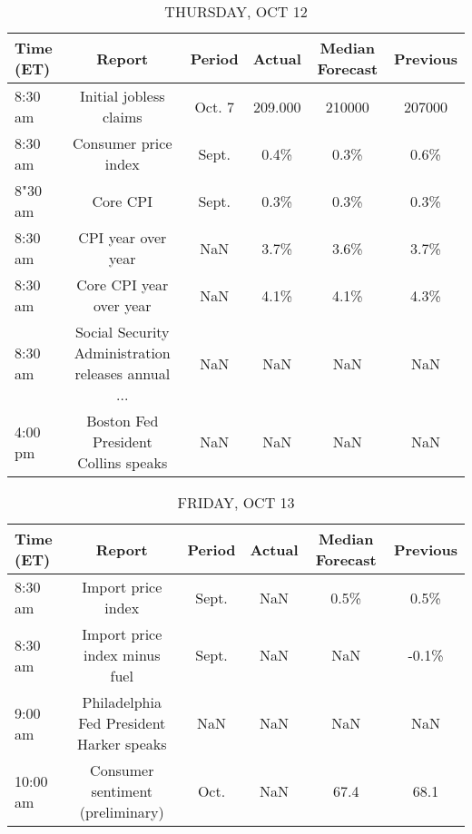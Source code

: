 \documentclass{article}%
\begin{document}
\begin{table}[htbp]%
\caption{THURSDAY, OCT 12}%
\centering%
\begin{adjustbox}{width=1\textwidth}%
\begin{tabular}{lccccc}
\toprule
Time (ET) &                                             Report & Period &  Actual & Median Forecast & Previous \\
\midrule
  8:30 am &                             Initial jobless claims & Oct. 7 & 209.000 &          210000 &   207000 \\
  8:30 am &                               Consumer price index &  Sept. &    0.4\% &            0.3\% &     0.6\% \\
  8"30 am &                                           Core CPI &  Sept. &    0.3\% &            0.3\% &     0.3\% \\
  8:30 am &                                 CPI year over year &    NaN &    3.7\% &            3.6\% &     3.7\% \\
  8:30 am &                            Core CPI year over year &    NaN &    4.1\% &            4.1\% &     4.3\% \\
  8:30 am & Social Security Administration releases annual ... &    NaN &     NaN &             NaN &      NaN \\
  4:00 pm &                Boston Fed President Collins speaks &    NaN &     NaN &             NaN &      NaN \\
\bottomrule
\end{tabular}
%
\end{adjustbox}%
\end{table}

%


\begin{table}[htbp]%
\caption{FRIDAY, OCT 13}%
\centering%
\begin{adjustbox}{width=1\textwidth}%
\begin{tabular}{lccccc}
\toprule
Time (ET) &                                   Report & Period & Actual & Median Forecast & Previous \\
\midrule
  8:30 am &                       Import price index &  Sept. &    NaN &            0.5\% &     0.5\% \\
  8:30 am &            Import price index minus fuel &  Sept. &    NaN &             NaN &    -0.1\% \\
  9:00 am & Philadelphia Fed President Harker speaks &    NaN &    NaN &             NaN &      NaN \\
 10:00 am &         Consumer sentiment (preliminary) &   Oct. &    NaN &            67.4 &     68.1 \\
\bottomrule
\end{tabular}
%
\end{adjustbox}%
\end{table}
\end{document}
